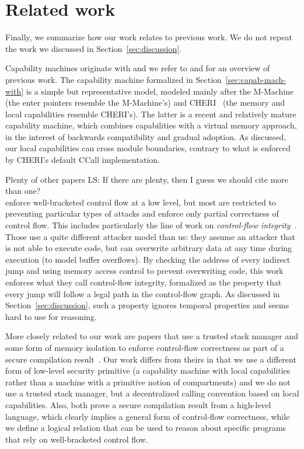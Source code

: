 \documentclass[acmsmall,review]{acmart}\settopmatter{printfolios=true}
\newcommand\lau[1]{{\color{purple} \sf \footnotesize {LS: #1}}\\}
\begin{document}
\section{Related work}
\label{sec:related-work}

Finally, we summarize how our work relates to previous work. We do not
repeat the work we discussed in Section~\ref{sec:discussion}.

Capability machines originate with \citet{Dennis:1966:PSM:365230.365252} and we refer to
\citet{Levy1984capability} and \citet{Watson2015Cheri} for an overview
of previous work. The capability machine formalized in
Section~\ref{sec:capab-mach-with} is a simple but representative
model, modeled mainly after the
M-Machine~\citep{Carter:1994:HSF:195473.195579} (the enter pointers
resemble the M-Machine's) and
CHERI~\citep{Watson2015Cheri,Woodruff:2014:CCM:2665671.2665740} (the
memory and local capabilities resemble CHERI's). The latter is a
recent and relatively mature capability machine, which combines
capabilities with a virtual memory approach, in the interest of
backwards compatibility and gradual adoption. As discussed, our local
capabilities can cross module boundaries, 
contrary to what is enforced by CHERI's default CCall implementation.

Plenty of other papers\lau{If there are plenty, then I guess we should cite more
  than one?} enforce well-bracketed control flow at a low level, but most are
restricted to preventing particular types of attacks and enforce only partial
correctness of control flow. This includes particularly the line of work on
\emph{control-flow integrity}~\citep{abadi_control-flow_2005}. Those use a quite
different attacker model than us: they assume an attacker that is not able to
execute code, but can overwrite arbitrary data at any time during execution (to
model buffer overflows). By checking the address of every indirect jump and
using memory access control to prevent overwriting code, this work enforces what
they call control-flow integrity, formalized as the property that every jump
will follow a legal path in the control-flow graph. As discussed in
Section~\ref{sec:discussion}, such a property ignores temporal properties and
seems hard to use for reasoning.

More closely related to our work are papers that use a trusted stack manager and
some form of memory isolation to enforce control-flow correctness as part of a
secure compilation
result~\citep{patrignani_modular_2016-1,juglaret_beyond_2016-1}. Our work
differs from theirs in that we use a different form of low-level security
primitive (a capability machine with local capabilities rather than a machine
with a primitive notion of compartments) and we do not use a trusted stack
manager, but a decentralized calling convention based on local
capabilities. Also, both prove a secure compilation result from a high-level
language, which clearly implies a general form of control-flow correctness,
while we define a logical relation that can be used to reason about
specific programs that rely on well-bracketed control flow.
\end{document}
